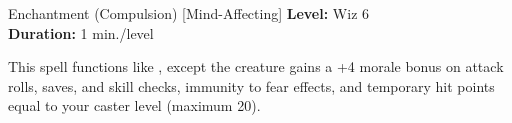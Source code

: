 {Enchantment (Compulsion) [Mind-Affecting]}
{
	\textbf{Level:}
	Wiz 6\\
	\textbf{Duration:}
	1 min./level\\
}
{
	This spell functions like , except the creature gains a +4 morale bonus on attack rolls, saves, and skill checks, immunity to fear effects, and temporary hit points equal to your caster level (maximum 20).

}
